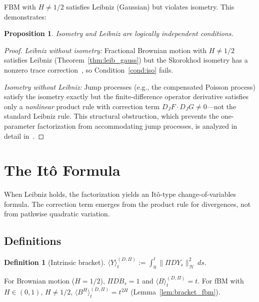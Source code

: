 \documentclass[11pt,a4paper]{article}
\theoremstyle{plain}
\newtheorem{proposition}[theorem]{Proposition}
\theoremstyle{definition}
\newtheorem{definition}[theorem]{Definition}
\theoremstyle{remark}
\newcommand{\BH}{B^H}
\begin{document}
FBM with $H \neq 1/2$ satisfies Leibniz (Gaussian) but violates isometry. This demonstrates:

\begin{proposition}\label{prop:indep}
Isometry and Leibniz are logically independent conditions.
\end{proposition}

\begin{proof}
\emph{Leibniz without isometry:} Fractional Brownian motion with $H \neq 1/2$ satisfies Leibniz (Theorem~\ref{thm:leib_gauss}) but the Skorokhod isometry has a nonzero trace correction~\cite[Proposition 1.3.5]{Decreusefond1999}, so Condition~\ref{cond:iso} fails.

\emph{Isometry without Leibniz:} Jump processes (e.g., the compensated Poisson process) satisfy the isometry exactly but the finite-difference operator derivative satisfies only a \emph{nonlinear} product rule with correction term $D_JF \cdot D_JG \neq 0$---not the standard Leibniz rule. This structural obstruction, which prevents the one-parameter factorization from accommodating jump processes, is analyzed in detail in~\cite{Fontes2026Banach}.
\end{proof}


\section{The It\^o Formula}\label{sec:ito}

When Leibniz holds, the factorization yields an It\^o-type change-of-variables formula. The correction term emerges from the product rule for divergences, not from pathwise quadratic variation.

\subsection{Definitions}

\begin{definition}[Intrinsic bracket]\label{def:bracket}
$\langle Y\rangle_t^{(D,\Pi)} := \int_0^t\|\Pi DY_s\|^2_{\mathcal{H}}\,ds$.
\end{definition}

For Brownian motion ($H = 1/2$), $\Pi DB_s = 1$ and $\langle B\rangle_t^{(D,\Pi)} = t$. For fBM with $H \in (0,1)$, $H \neq 1/2$, $\langle\BH\rangle_t^{(D,\Pi)} = t^{2H}$ (Lemma~\ref{lem:bracket_fbm}).
\end{document}
